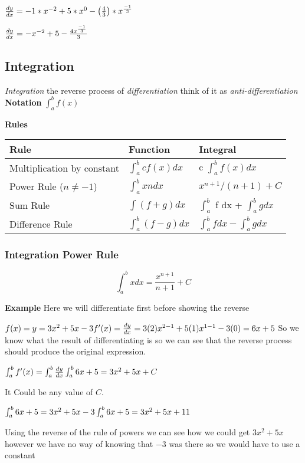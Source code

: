 \documentclass{article}
\begin{document}
$\frac{dy}{dx} = -1*x^{-2} +5*x^{0} -  \left(\frac{4}{3}\right) * x^{\frac{-1}{3}}  \\$

$\frac{dy}{dx} = -x^{-2} + 5 -  \frac{4x^{\frac{-1}{3}}}{3}  \\$




\newpage
\subsection{Integration}
\textit{Integration} the reverse process of \textit{differentiation} think of it as \textit{anti-differentiation}
\textbf{Notation}
$ \int_a^b f(x) $

\textbf{Rules}
 
\begin{tabular}{l|l|l}	 	 
Rule & Function & Integral\\
\hline
Multiplication by constant &	 $\int_a^b cf(x) dx$	& c $\int_a^b f(x) dx$ \\
Power Rule ($n \neq -1$)	& $\int_a^b xn dx$ &	$x^{n+1}/(n+1) + C $\\
Sum Rule	 &$\int(f + g) dx$	&$\int_a^b$ f dx + $\int_a^b g dx $\\
Difference Rule &	$\int_a^b (f - g) dx$	& $\int_a^b f dx - \int_a^b g dx $\\
\hline
\end{tabular}

\subsubsection{Integration Power Rule}
\begin{equation}
\int_a^b x dx = \frac{x^{n+1}}{n+1} + C
\end{equation}

\textbf{Example}
Here we will differentiate first before showing the reverse

$ f(x) = y = 3x^{2} + 5x - 3\\
f'(x) = \frac{dy}{dx} = 3(2)x^{2-1} + 5(1)x^{1-1} - 3(0) = 6x + 5 $
So we know what the result of differentiating is so we can see that the reverse process should produce the original expression.

$
\int_a^b f'(x) =   \int_a^b \frac{dy}{dx}\\
\int_a^b 6x + 5 = 3x^{2} + 5x + C \\
$

It Could be any value of $C$.

$\int_a^b 6x + 5 = 3x^{2}+5x-3 \\
\int_a^b 6x + 5 = 3x^{2} + 5x + 11 \\
$

Using the reverse of the rule of powers we can see how we could get  $3x^{2} + 5x $ however we have no way of knowing that $-3$ was there so we would have to use a constant 
\end{document}
